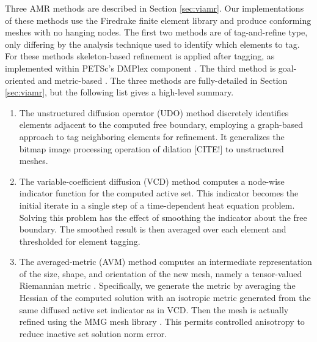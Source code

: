 \documentclass[]{interact}
\theoremstyle{plain}%
\theoremstyle{definition}
\theoremstyle{remark}
\begin{document}
Three AMR methods are described in Section \ref{sec:viamr}.  Our implementations of these methods use the Firedrake finite element library and produce conforming meshes with no hanging nodes.  The first two methods are of tag-and-refine type, only differing by the analysis technique used to identify which elements to tag.  For these methods skeleton-based refinement \cite{PlazaCarey2000} is applied after tagging, as implemented within PETSc's DMPlex component \cite{petsc-user-ref}.  The third method is goal-oriented and metric-based \cite{Wallworketal2020}.  The three methods are fully-detailed in Section \ref{sec:viamr}, but the following list gives a high-level summary.

\renewcommand{\labelenumi}{(\roman{enumi})}
\begin{enumerate}
\item The unstructured diffusion operator (UDO) method discretely identifies elements adjacent to the computed free boundary, employing a graph-based approach to tag neighboring elements for refinement.  It generalizes the bitmap image processing operation of dilation [CITE!] to unstructured meshes.
\item The variable-coefficient diffusion (VCD) method computes a node-wise indicator function for the computed active set.  This indicator becomes the initial iterate in a single step of a time-dependent heat equation problem.  Solving this problem has the effect of smoothing the indicator about the free boundary.  The smoothed result is then averaged over each element and thresholded for element tagging.
\item The averaged-metric (AVM) method computes an intermediate representation of the size, shape, and orientation of the new mesh, namely a tensor-valued Riemannian metric \cite{Alauzet2010}.  Specifically, we generate the metric by averaging the Hessian of the computed solution with an isotropic metric generated from the same diffused active set indicator as in VCD.  Then the mesh is actually refined using the MMG mesh library \cite{DapognyDobrzynskiFrey2014}.  This permits controlled anisotropy \cite{Wallworketal2020} to reduce inactive set solution norm error.
\end{enumerate}

\end{document}
